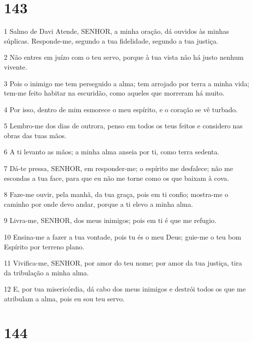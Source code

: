 \chapter{143}

\par 1 Salmo de Davi Atende, SENHOR, a minha oração, dá ouvidos às minhas súplicas. Responde-me, segundo a tua fidelidade, segundo a tua justiça.
\par 2 Não entres em juízo com o teu servo, porque à tua vista não há justo nenhum vivente.
\par 3 Pois o inimigo me tem perseguido a alma; tem arrojado por terra a minha vida; tem-me feito habitar na escuridão, como aqueles que morreram há muito.
\par 4 Por isso, dentro de mim esmorece o meu espírito, e o coração se vê turbado.
\par 5 Lembro-me dos dias de outrora, penso em todos os teus feitos e considero nas obras das tuas mãos.
\par 6 A ti levanto as mãos; a minha alma anseia por ti, como terra sedenta.
\par 7 Dá-te pressa, SENHOR, em responder-me; o espírito me desfalece; não me escondas a tua face, para que eu não me torne como os que baixam à cova.
\par 8 Faze-me ouvir, pela manhã, da tua graça, pois em ti confio; mostra-me o caminho por onde devo andar, porque a ti elevo a minha alma.
\par 9 Livra-me, SENHOR, dos meus inimigos; pois em ti é que me refugio.
\par 10 Ensina-me a fazer a tua vontade, pois tu és o meu Deus; guie-me o teu bom Espírito por terreno plano.
\par 11 Vivifica-me, SENHOR, por amor do teu nome; por amor da tua justiça, tira da tribulação a minha alma.
\par 12 E, por tua misericórdia, dá cabo dos meus inimigos e destrói todos os que me atribulam a alma, pois eu sou teu servo.

\chapter{144}


